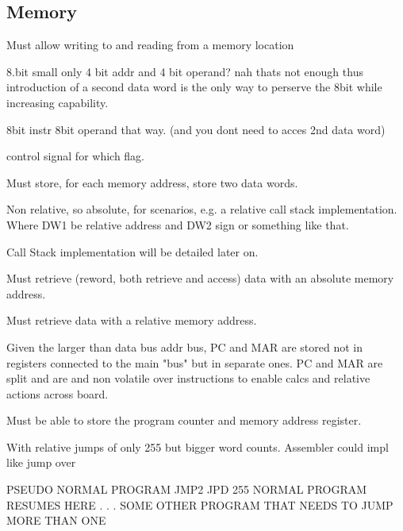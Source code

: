 \subsection{Memory}

\begin{turing-requirement}
Must allow writing to and reading from a memory location
\end{turing-requirement}


8.bit small
only 4 bit addr and 4 bit operand? nah thats not enough
thus introduction of a second data word is the only way to perserve the 8bit while increasing capability. 

8bit instr 8bit operand that way. (and you dont need to acces 2nd data word)

control signal for which flag. 

\begin{feat-requirement}
Must store, for each memory address, store two data words. 
\end{feat-requirement}


Non relative, so absolute, for scenarios, e.g. a relative call stack implementation.
Where DW1 be relative address 
and DW2 sign or something like that. 

Call Stack implementation will be detailed later on. 
\begin{feat-requirement}
Must retrieve (reword, both retrieve and access) data with an absolute memory address. 
\end{feat-requirement}

\begin{feat-requirement}
Must retrieve data with a relative memory address. 
\end{feat-requirement}


Given the larger than data bus addr bus, PC and MAR are stored not in registers connected to the main "bus" but in separate ones. 
PC and MAR are split and are and non volatile over instructions to enable calcs and relative actions across board.

\begin{feat-requirement}
Must be able to store the program counter and memory address register.
\end{feat-requirement}

With relative jumps of only 255 but bigger word counts. 
Assembler could impl like jump over 

PSEUDO
NORMAL PROGRAM
JMP2
JPD 255 
NORMAL PROGRAM RESUMES HERE
.
.
.
SOME OTHER PROGRAM THAT NEEDS TO JUMP MORE THAN ONE


% 

